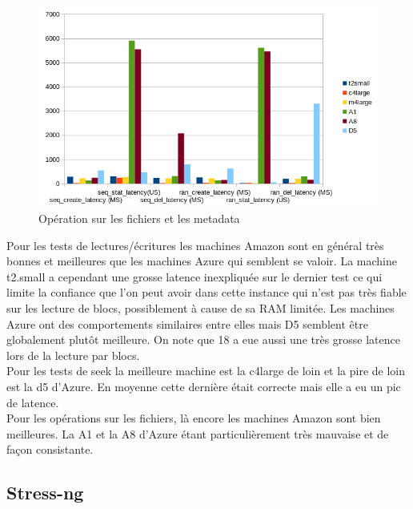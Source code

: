 \documentclass[11pt]{article}
\begin{document}
	\begin{figure}[htbp]
	\begin{center}
	\includegraphics[scale=0.9]{images/metadata.png} 
	\caption{Opération sur les fichiers et les metadata}
	\label{fig:fig0}
	\end{center}
	\end{figure}

	Pour les tests de lectures/écritures les machines Amazon sont en général
	très bonnes et meilleures que les machines Azure qui semblent se valoir.
	La machine t2.small a cependant une grosse latence inexpliquée sur le 
	dernier test ce qui limite la confiance que l'on peut avoir dans cette
	instance qui n'est pas très fiable sur les lecture de blocs, 
	possiblement à cause de sa RAM limitée.
	Les machines Azure ont des comportements similaires entre elles mais
	D5 semblent être globalement plutôt meilleure. On note que 18 a eue
	aussi une très grosse latence lors de la lecture par blocs. \\

	Pour les tests de seek la meilleure machine est la c4large de loin et
	la pire de loin est la d5 d'Azure. En moyenne cette dernière était
	correcte mais elle a eu un pic de latence. \\

	Pour les opérations sur les fichiers, là encore les machines Amazon sont
	bien meilleures. La A1 et la A8 d'Azure étant particulièrement très
	mauvaise et de façon consistante. \\

\pagebreak
\subsection{Stress-ng}
\end{document}
